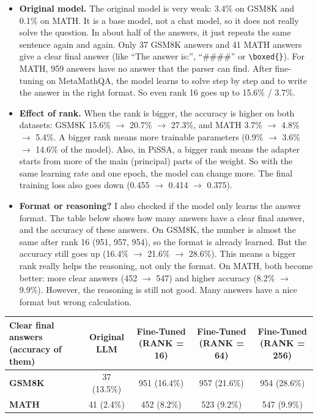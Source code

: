 \documentclass[10pt,a4paper]{article}
\begin{document}
\begin{itemize}
  \item \textbf{Original model.} The original model is very weak: 3.4\% on GSM8K and 0.1\% on MATH. It is a base
  model, not a chat model, so it does not really solve the question. In about half of the answers, it just repeats
  the same sentence again and again. Only 37 GSM8K answers and 41 MATH answers give a clear final answer (like ``The answer is:'',
  ``\#\#\#\#'' or \verb|\boxed{}|). For MATH, 959 answers have no answer that the parser can find. After
  fine-tuning on MetaMathQA, the model learns to solve step by step and to write the answer in the right format.
  So even rank 16 goes up to 15.6\% / 3.7\%.
  \item \textbf{Effect of rank.} When the rank is bigger, the accuracy is higher on both datasets: GSM8K
  15.6\% $\to$ 20.7\% $\to$ 27.3\%, and MATH 3.7\% $\to$ 4.8\% $\to$ 5.4\%. A bigger rank means more trainable
  parameters (0.9\% $\to$ 3.6\% $\to$ 14.6\% of the model). Also, in PiSSA, a bigger rank means the adapter starts
  from more of the main (principal) parts of the weight. So with the same learning rate and one epoch, the model
  can change more. The final training loss also goes down (0.455 $\to$ 0.414 $\to$ 0.375).
  \item \textbf{Format or reasoning?} I also checked if the model only learns the answer format. The table below
  shows how many answers have a clear final answer, and the accuracy of these answers. On GSM8K, the number is
  almost the same after rank 16 (951, 957, 954), so the format is already learned. But the accuracy still goes up
  (16.4\% $\to$ 21.6\% $\to$ 28.6\%). This means a bigger rank really helps the reasoning, not only the format. On
  MATH, both become better: more clear answers (452 $\to$ 547) and higher accuracy (8.2\% $\to$ 9.9\%). However,
  the reasoning is still not good. Many answers have a nice format but wrong calculation.
\end{itemize}

\begin{center}\small
\begin{tabularx}{\textwidth}{|p{3.6cm}|C|C|C|C|}
  \hline
  \textbf{Clear final answers (accuracy of them)} & \textbf{Original LLM} & \textbf{Fine-Tuned (RANK = 16)} & \textbf{Fine-Tuned (RANK = 64)} & \textbf{Fine-Tuned (RANK = 256)} \\
  \hline
  \textbf{GSM8K} & 37 (13.5\%) & 951 (16.4\%) & 957 (21.6\%) & 954 (28.6\%) \\ \hline
  \textbf{MATH}  & 41 (2.4\%)  & 452 (8.2\%)  & 523 (9.2\%)  & 547 (9.9\%)  \\
  \hline
\end{tabularx}
\end{center}
\end{document}
